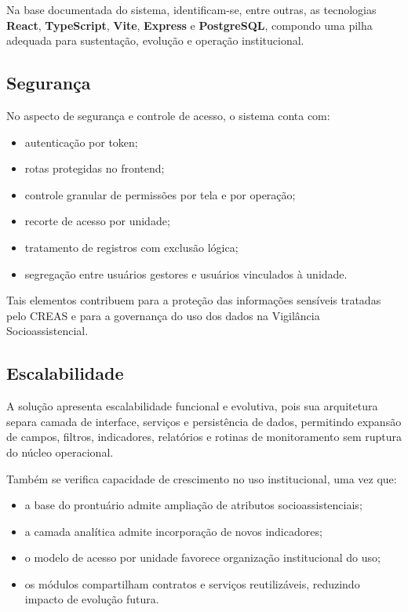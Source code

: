 \documentclass[12pt,a4paper]{article}
\begin{document}
Na base documentada do sistema, identificam-se, entre outras, as tecnologias \textbf{React}, \textbf{TypeScript}, \textbf{Vite}, \textbf{Express} e \textbf{PostgreSQL}, compondo uma pilha adequada para sustentação, evolução e operação institucional.

\subsection{Segurança}

No aspecto de segurança e controle de acesso, o sistema conta com:

\begin{itemize}[leftmargin=1.5cm]
\item autenticação por token;
\item rotas protegidas no frontend;
\item controle granular de permissões por tela e por operação;
\item recorte de acesso por unidade;
\item tratamento de registros com exclusão lógica;
\item segregação entre usuários gestores e usuários vinculados à unidade.
\end{itemize}

Tais elementos contribuem para a proteção das informações sensíveis tratadas pelo CREAS e para a governança do uso dos dados na Vigilância Socioassistencial.

\subsection{Escalabilidade}

A solução apresenta escalabilidade funcional e evolutiva, pois sua arquitetura separa camada de interface, serviços e persistência de dados, permitindo expansão de campos, filtros, indicadores, relatórios e rotinas de monitoramento sem ruptura do núcleo operacional.

Também se verifica capacidade de crescimento no uso institucional, uma vez que:

\begin{itemize}[leftmargin=1.5cm]
\item a base do prontuário admite ampliação de atributos socioassistenciais;
\item a camada analítica admite incorporação de novos indicadores;
\item o modelo de acesso por unidade favorece organização institucional do uso;
\item os módulos compartilham contratos e serviços reutilizáveis, reduzindo impacto de evolução futura.
\end{itemize}
\end{document}
